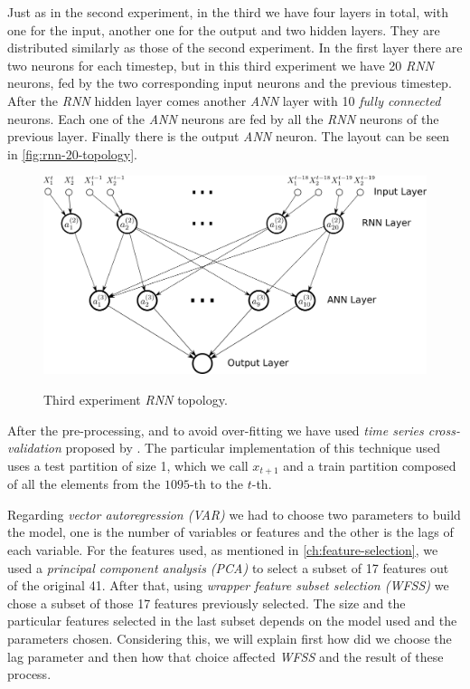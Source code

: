 Just as in the second experiment, in the third we have four layers in
total, with one for the input, another one for the output and two
hidden layers. They are distributed similarly as those of the second
experiment. In the first layer there are two neurons for each
timestep, but in this third experiment we have 20 \textit{RNN}
neurons, fed by the two corresponding input neurons and the previous
timestep. After the \textit{RNN} hidden layer comes another
\textit{ANN} layer with 10 \textit{fully connected} neurons. Each one
of the \textit{ANN} neurons are fed by all the \textit{RNN} neurons of
the previous layer. Finally there is the output \textit{ANN} neuron.
The layout can be seen in \autoref{fig:rnn-20-topology}.

\begin{figure}[bth]
  \myfloatalign
  {
    \includegraphics[width=1\linewidth]
    {gfx/rnn_20_topology}}
  \caption{Third experiment \textit{RNN} topology.}
  \label{fig:rnn-20-topology}
\end{figure}

After the pre-processing, and to avoid over-fitting we have used
\textit{time series cross-validation} proposed by
\cite{robjhyndman2010}. The particular implementation of this
technique used uses a test partition of size 1, which we call $x_{t +
1}$ and a train partition composed of all the elements from the
$1095$-th to the $t$-th.


Regarding \textit{vector autoregression (VAR)} we had to choose two
parameters to build the model, one is the number of variables or
features and the other is the lags of each variable. For the features
used, as mentioned in \autoref{ch:feature-selection}, we used a
\textit{principal component analysis (PCA)} to select a subset of 17
features out of the original 41. After that, using \textit{wrapper
feature subset selection (WFSS)} we chose a subset of those 17
features previously selected. The size and the particular features
selected in the last subset depends on the model used and the
parameters chosen. Considering this, we will explain first how did we
choose the lag parameter and then how that choice affected
\textit{WFSS} and the result of these process.

